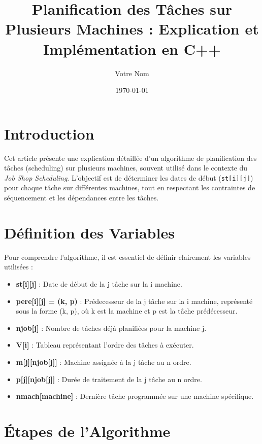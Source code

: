 \documentclass[12pt]{article}
\title{Planification des Tâches sur Plusieurs Machines : Explication et Implémentation en C++}
\author{Votre Nom}
\date{\today}
\begin{document}
\maketitle

\tableofcontents
\newpage

\section{Introduction}

Cet article présente une explication détaillée d'un algorithme de planification des tâches (scheduling) sur plusieurs machines, souvent utilisé dans le contexte du \textit{Job Shop Scheduling}. L'objectif est de déterminer les dates de début (\texttt{st[i][j]}) pour chaque tâche sur différentes machines, tout en respectant les contraintes de séquencement et les dépendances entre les tâches.

\section{Définition des Variables}

Pour comprendre l'algorithme, il est essentiel de définir clairement les variables utilisées :

\begin{itemize}
    \item \textbf{st[i][j]} : Date de début de la j tâche sur la i machine.
    \item \textbf{pere[i][j] = (k, p)} : Prédecesseur de la j tâche sur la i machine, représenté sous la forme (k, p), où k est la machine et p est la tâche prédécesseur.
    \item \textbf{njob[j]} : Nombre de tâches déjà planifiées pour la machine j.
    \item \textbf{V[i]} : Tableau représentant l'ordre des tâches à exécuter.
    \item \textbf{m[j][njob[j]]} : Machine assignée à la j tâche au n ordre.
    \item \textbf{p[j][njob[j]]} : Durée de traitement de la j tâche au n ordre.
    \item \textbf{nmach[machine]} : Dernière tâche programmée sur une machine spécifique.
\end{itemize}

\section{Étapes de l'Algorithme}
\end{document}
